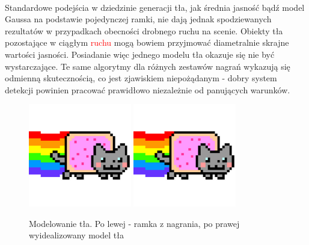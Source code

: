 \paragraph{}
Standardowe podejścia w dziedzinie generacji tła, jak średnia jasność bądź model Gaussa na podstawie pojedynczej ramki, nie dają jednak spodziewanych rezultatów w przypadkach obecności drobnego ruchu na scenie. Obiekty tła pozostające w ciągłym \textcolor{red}{ruchu} mogą bowiem przyjmować diametralnie skrajne wartości jasności. Posiadanie więc jednego modelu tła okazuje się nie być wystarczające. Te same algorytmy dla różnych zestawów nagrań wykazują się odmienną skutecznością, co jest zjawiskiem niepożądanym - dobry system detekcji powinien pracować prawidłowo niezależnie od panujących warunków.
\begin{figure}[!htb]
\centering

\includegraphics[width=0.4\textwidth]{img/sample}
\includegraphics[width=0.4\textwidth]{img/sample}
\caption{Modelowanie tła. Po lewej - ramka z nagrania, po prawej wyidealizowany model tła}
\end{figure}
